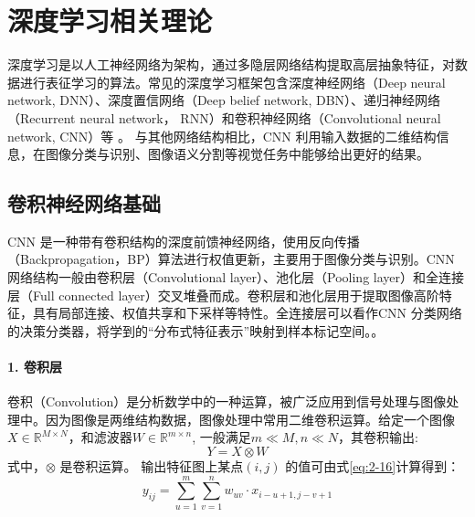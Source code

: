 
\chapter{深度学习相关理论}
\label{cha:chap02}
深度学习是以人工神经网络为架构，通过多隐层网络结构提取高层抽象特征，对数据进行表征学习的算法。常见的深度学习框架包含深度神经网络（Deep neural network, DNN）、深度置信网络（Deep belief network, DBN）、递归神经网络（Recurrent neural network， RNN）和卷积神经网络（Convolutional neural network, CNN）等\cite{krizhevsky2012imagenet} 。 与其他网络结构相比，CNN 利用输入数据的二维结构信息，在图像分类与识别、图像语义分割等视觉任务中能够给出更好的结果。

\section{卷积神经网络基础}
\label{sec:chap02-1}

CNN 是一种带有卷积结构的深度前馈神经网络，使用反向传播（Backpropagation，BP）算法进行权值更新，主要用于图像分类与识别。CNN 网络结构一般由卷积层（Convolutional layer）、池化层（Pooling layer）和全连接层（Full connected layer）交叉堆叠而成。卷积层和池化层用于提取图像高阶特征，具有局部连接、权值共享和下采样等特性。全连接层可以看作CNN 分类网络的决策分类器，将学到的“分布式特征表示”映射到样本标记空间。。

\subsubsection*{1. 卷积层}
\label{subsec:chap02-2-1-1}
卷积（Convolution）是分析数学中的一种运算，被广泛应用到信号处理与图像处理中。因为图像是两维结构数据，图像处理中常用二维卷积运算。给定一个图像$X \in \mathbb{R}^{M \times N}$，和滤波器$W \in \mathbb{R}^{m \times n}$, 一般满足$m \ll M, n \ll N$，其卷积输出:
\begin{equation}
  \label{eq:2-15}
  Y = X \otimes W
\end{equation}
式中，$\otimes$ 是卷积运算。 输出特征图上某点$(i,j)$ 的值可由式\ref{eq:2-16}计算得到：
\begin{equation}
  \label{eq:2-16}
  y_{ij} = \sum_{u=1}^m\sum_{v=1}^n w_{uv}\cdot x_{i-u+1,j-v+1}
\end{equation}


